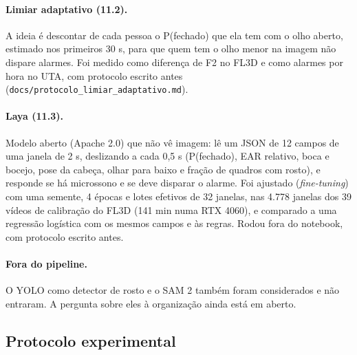 \documentclass[11pt,a4paper]{article}
\begin{document}
\paragraph{Limiar adaptativo (11.2).} A ideia é descontar de cada pessoa o P(fechado) que ela tem com o olho aberto, estimado nos primeiros 30 s, para que quem tem o olho menor na imagem não dispare alarmes. Foi medido como diferença de F2 no FL3D e como alarmes por hora no UTA, com protocolo escrito antes (\texttt{docs/protocolo\_limiar\_adaptativo.md}).

\paragraph{Laya (11.3).} Modelo aberto (Apache 2.0) que não vê imagem: lê um JSON de 12 campos de uma janela de 2 s, deslizando a cada 0,5 s (P(fechado), EAR relativo, boca e bocejo, pose da cabeça, olhar para baixo e fração de quadros com rosto), e responde se há microssono e se deve disparar o alarme. Foi ajustado (\emph{fine-tuning}) com uma semente, 4 épocas e lotes efetivos de 32 janelas, nas 4.778 janelas dos 39 vídeos de calibração do FL3D (141 min numa RTX 4060), e comparado a uma regressão logística com os mesmos campos e às regras. Rodou fora do notebook, com protocolo escrito antes.

\paragraph{Fora do pipeline.} O YOLO como detector de rosto e o SAM 2 também foram considerados e não entraram. A pergunta sobre eles à organização ainda está em aberto.

\subsection{Protocolo experimental}
\label{sec:protocolo}
\end{document}
